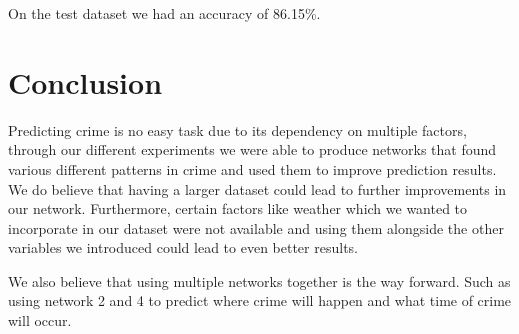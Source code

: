 \documentclass[conference]{IEEEtran}
\begin{document}
On the test dataset we had an accuracy of 86.15\%. 

\section{Conclusion}

Predicting crime is no easy task due to its dependency on multiple factors, through our different experiments we were able to produce
networks that found various different patterns in crime and used them to improve prediction results. We do believe that having a larger
dataset could lead to further improvements in our network. Furthermore, certain factors like weather which we wanted to incorporate in
our dataset were not available and using them alongside the other variables we introduced could lead to even better results. 

We also believe that using multiple networks together is the way forward. Such as using network 2 and 4 to predict where crime will happen
and what time of crime will occur.



\end{document}
